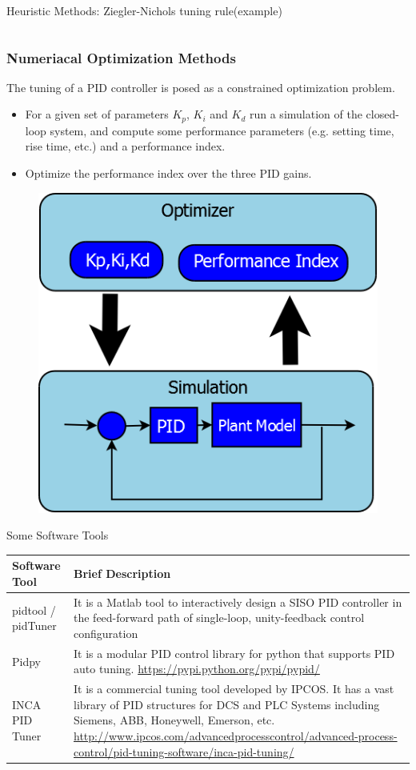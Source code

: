 \begin{frame}{Heuristic Methods: Ziegler-Nichols tuning rule(example)}
{\begin{example}
\begin{columns}
\begin{column}{0.4 \textwidth}
					\end{column}
				\end{columns}
			
	\end{example}}
\end{frame}
\begin{frame}
	\small{
	\frametitle{Numeriacal Optimization Methods}
	The tuning of a PID controller is posed as a constrained optimization problem. 
	\begin{itemize}
			\item For a given set of parameters $K_p$, $K_i$ and $K_d$ run a simulation of the closed-loop system, and compute some performance parameters (e.g. setting time, rise time, etc.) and a performance index.
			\item Optimize the performance index over the three PID gains.
	\end{itemize}}
\begin{figure}

\includegraphics[width=0.3\linewidth]{img/PID_1}
\end{figure}

	
\end{frame}
\begin{frame}{Some Software Tools}
	\small{
	\begin{tabular}{|p{3cm}|p{7cm}|}
		\hline Software Tool  & Brief Description  \\ 
		\hline pidtool / pidTuner
		 & It is a Matlab tool to interactively design a SISO PID controller in the feed-forward path of single-loop, unity-feedback control configuration \\ 
		\hline Pidpy
		 & It is a modular PID control library for python that supports PID auto tuning. \url{https://pypi.python.org/pypi/pypid/}
		  \\ 
		\hline INCA PID Tuner
		 & It is a commercial tuning tool developed by IPCOS. It has a vast library of PID structures for DCS and PLC  Systems including Siemens, ABB, Honeywell, Emerson, etc. \url{http://www.ipcos.com/advancedprocesscontrol/advanced-process-control/pid-tuning-software/inca-pid-tuning/}
		   \\ 
		\hline 
	\end{tabular}}
\end{frame}
